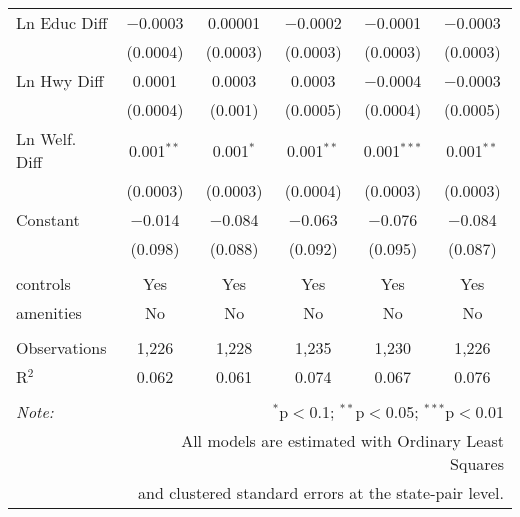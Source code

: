 \begin{table}[!htbp]
\begin{tabular}{@{\extracolsep{5pt}}lccccc}
  Ln Educ Diff & $-$0.0003 & 0.00001 & $-$0.0002 & $-$0.0001 & $-$0.0003 \\ 
  & (0.0004) & (0.0003) & (0.0003) & (0.0003) & (0.0003) \\ 
  Ln Hwy Diff & 0.0001 & 0.0003 & 0.0003 & $-$0.0004 & $-$0.0003 \\ 
  & (0.0004) & (0.001) & (0.0005) & (0.0004) & (0.0005) \\ 
  Ln Welf. Diff & 0.001$^{**}$ & 0.001$^{*}$ & 0.001$^{**}$ & 0.001$^{***}$ & 0.001$^{**}$ \\ 
  & (0.0003) & (0.0003) & (0.0004) & (0.0003) & (0.0003) \\ 
  Constant & $-$0.014 & $-$0.084 & $-$0.063 & $-$0.076 & $-$0.084 \\ 
  & (0.098) & (0.088) & (0.092) & (0.095) & (0.087) \\ 
 \hline \\[-1.8ex] 
controls & Yes & Yes & Yes & Yes & Yes \\ 
amenities & No & No & No & No & No \\ 
\hline \\[-1.8ex] 
Observations & 1,226 & 1,228 & 1,235 & 1,230 & 1,226 \\ 
R$^{2}$ & 0.062 & 0.061 & 0.074 & 0.067 & 0.076 \\ 
\hline 
\hline \\[-1.8ex] 
\textit{Note:}  & \multicolumn{5}{r}{$^{*}$p$<$0.1; $^{**}$p$<$0.05; $^{***}$p$<$0.01} \\ 
 & \multicolumn{5}{r}{All models are estimated with Ordinary Least Squares} \\ 
 & \multicolumn{5}{r}{and clustered standard errors at the state-pair level.} \\ 
\end{tabular} 
\end{table} 
